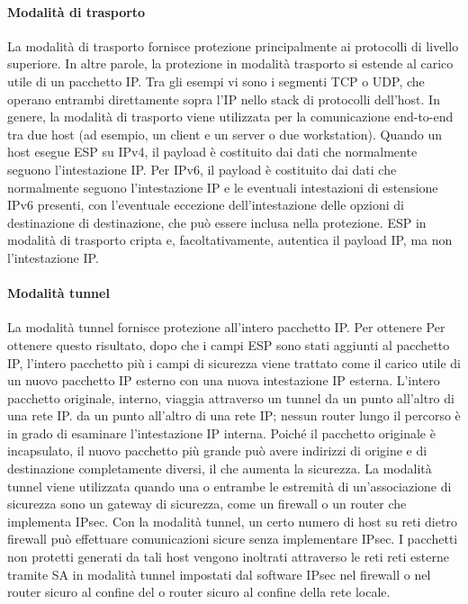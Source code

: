\paragraph{Modalità di trasporto} La modalità di trasporto fornisce protezione principalmente ai protocolli di livello superiore. In altre parole, la protezione in modalità trasporto si estende al carico utile di un pacchetto IP. Tra gli esempi vi sono i segmenti TCP o UDP, che operano entrambi direttamente sopra l'IP nello stack di protocolli dell'host. In genere, la modalità di trasporto viene utilizzata per la comunicazione end-to-end tra due host (ad esempio, un client e un server o due workstation). Quando un host esegue ESP su IPv4, il payload è costituito dai dati che normalmente seguono l'intestazione IP. Per IPv6, il payload è costituito dai dati che normalmente seguono l'intestazione IP e le eventuali intestazioni di estensione IPv6 presenti, con l'eventuale eccezione dell'intestazione delle opzioni di destinazione di destinazione, che può essere inclusa nella protezione. ESP in modalità di trasporto cripta e, facoltativamente, autentica il payload IP, ma non l'intestazione IP. 

\singlespacing

\paragraph{Modalità tunnel} La modalità tunnel fornisce protezione all'intero pacchetto IP. Per ottenere
Per ottenere questo risultato, dopo che i campi ESP sono stati aggiunti al pacchetto IP, l'intero pacchetto più i campi 
di sicurezza viene trattato come il carico utile di un nuovo pacchetto IP esterno con una nuova intestazione IP esterna.
L'intero pacchetto originale, interno, viaggia attraverso un tunnel da un punto all'altro di una rete IP.
da un punto all'altro di una rete IP; nessun router lungo il percorso è in grado di esaminare l'intestazione IP interna.
Poiché il pacchetto originale è incapsulato, il nuovo pacchetto più grande può avere indirizzi di origine e di destinazione completamente diversi, il che aumenta la sicurezza. La modalità tunnel viene utilizzata quando una o entrambe le estremità di un'associazione di sicurezza sono un gateway di sicurezza, come un firewall o un router che implementa IPsec. Con la modalità tunnel, un certo numero di host su reti dietro firewall può effettuare comunicazioni sicure senza implementare IPsec. I pacchetti non protetti generati da tali host vengono inoltrati attraverso le reti reti esterne tramite SA in modalità tunnel impostati dal software IPsec nel firewall o nel router sicuro al confine del o router sicuro al confine della rete locale. 

